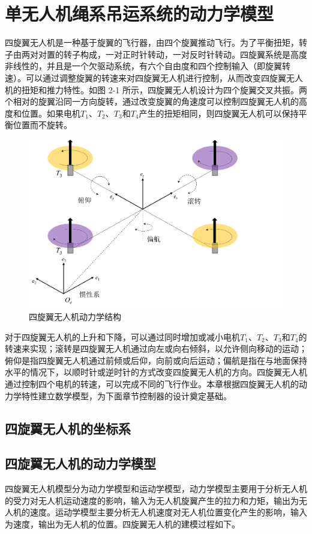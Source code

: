 \documentclass[lang=chs, degree=master, blindreview=false, winfonts=true]{yanputhesis}
\begin{document}
\section{单无人机绳系吊运系统的动力学模型}
四旋翼无人机是一种基于旋翼的飞行器，由四个旋翼推动飞行。为了平衡扭矩，转子由两对对置的转子构成，一对正时针转动，一对反时针转动。四旋翼系统是高度非线性的，并且是一个欠驱动系统，有六个自由度和四个控制输入（即旋翼转速）。可以通过调整旋翼的转速来对四旋翼无人机进行控制，从而改变四旋翼无人机的扭矩和推力特性。如图 2-1 所示，四旋翼无人机设计为四个旋翼交叉共振。两个相对的旋翼沿同一方向旋转，通过改变旋翼的角速度可以控制四旋翼无人机的高度和位置。如果电机$T_1$、$T_2$、$T_3$和$T_4$产生的扭矩相同，则四旋翼无人机可以保持平衡位置而不旋转。

\begin{figure}[htbp]
	\centering
	\includegraphics[width=6 in]{picture/2_1.png}
	\caption{四旋翼无人机动力学结构}
	\label{fig-2_1}
\end{figure}

对于四旋翼无人机的上升和下降，可以通过同时增加或减小电机$T_1$、$T_2$、$T_3$和$T_4$的转速来实现；滚转是四旋翼无人机通过向左或向右倾斜，以允许侧向移动的运动；俯仰是指四旋翼无人机通过前倾或后仰，向前或向后运动；偏航是指在与地面保持水平的情况下，以顺时针或逆时针的方式改变四旋翼无人机的方向。四旋翼无人机通过控制四个电机的转速，可以完成不同的飞行作业。本章根据四旋翼无人机的动力学特性建立数学模型，为下面章节控制器的设计奠定基础。
\subsection{四旋翼无人机的坐标系}

\subsection{四旋翼无人机的动力学模型}
四旋翼无人机模型分为动力学模型和运动学模型，动力学模型主要用于分析无人机的受力对无人机运动速度的影响，输入为无人机旋翼产生的拉力和力矩，输出为无人机的速度。运动学模型主要分析无人机速度对无人机位置变化产生的影响，输入为速度，输出为无人机的位置。四旋翼无人机的建模过程如下。
\end{document}
